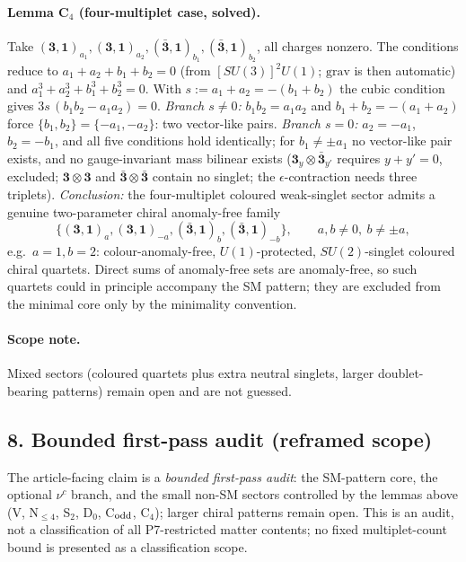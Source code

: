 \paragraph{Lemma C$_4$ (four-multiplet case, solved).}
Take $(\mathbf 3,\mathbf 1)_{a_1},(\mathbf 3,\mathbf 1)_{a_2},
(\bar{\mathbf 3},\mathbf 1)_{b_1},(\bar{\mathbf 3},\mathbf 1)_{b_2}$,
all charges nonzero.
The conditions reduce to $a_1{+}a_2{+}b_1{+}b_2=0$ (from
$[SU(3)]^2U(1)$; $\mathrm{grav}$ is then automatic) and
$a_1^3{+}a_2^3{+}b_1^3{+}b_2^3=0$.
With $s:=a_1{+}a_2=-(b_1{+}b_2)$ the cubic condition gives
$3s\,(b_1b_2-a_1a_2)=0$.
\emph{Branch $s\neq0$:} $b_1b_2=a_1a_2$ and $b_1{+}b_2=-(a_1{+}a_2)$
force $\{b_1,b_2\}=\{-a_1,-a_2\}$: two vector-like pairs.
\emph{Branch $s=0$:} $a_2=-a_1$, $b_2=-b_1$, and all five
conditions hold identically; for $b_1\neq\pm a_1$ no vector-like
pair exists, and no gauge-invariant mass bilinear exists
($\mathbf 3_y\otimes\bar{\mathbf 3}_{y'}$ requires $y{+}y'=0$,
excluded; $\mathbf 3\otimes\mathbf 3$ and
$\bar{\mathbf 3}\otimes\bar{\mathbf 3}$ contain no singlet; the
$\epsilon$-contraction needs three triplets).
\emph{Conclusion:} the four-multiplet coloured weak-singlet sector
admits a genuine two-parameter chiral anomaly-free family
\[
\{(\mathbf 3,\mathbf 1)_{a},(\mathbf 3,\mathbf 1)_{-a},
(\bar{\mathbf 3},\mathbf 1)_{b},(\bar{\mathbf 3},\mathbf 1)_{-b}\},
\qquad a,b\neq0,\ b\neq\pm a,
\]
e.g.\ $a=1,b=2$: colour-anomaly-free, $U(1)$-protected,
$SU(2)$-singlet coloured chiral quartets.
Direct sums of anomaly-free sets are anomaly-free, so such
quartets could in principle accompany the SM pattern; they are
excluded from the minimal core only by the minimality convention.
\paragraph{Scope note.}
Mixed sectors (coloured quartets plus extra neutral singlets,
larger doublet-bearing patterns) remain open and are not guessed.

\subsection*{8. Bounded first-pass audit (reframed scope)}
The article-facing claim is a \emph{bounded first-pass audit}: the
SM-pattern core, the optional $\nu^c$ branch, and the small
non-SM sectors controlled by the lemmas above (V, N$_{\le4}$,
S$_2$, D$_0$, C$_{\rm odd}$, C$_4$); larger chiral patterns remain
open.
This is an audit, not a classification of all P7-restricted matter
contents; no fixed multiplet-count bound is presented as a
classification scope.

